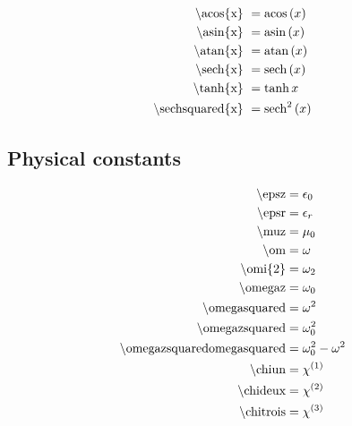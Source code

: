\begin{subequations}
\begin{align}
\textrm{\textbackslash acos\{x\}         }  & = \textrm{acos} \left( x \right)            \label{eqn:acos} \\
\textrm{\textbackslash asin\{x\}         }  & = \textrm{asin} \left( x \right)            \label{eqn:asin} \\
\textrm{\textbackslash atan\{x\}         }  & = \textrm{atan} \left( x \right)            \label{eqn:atan} \\
\textrm{\textbackslash sech\{x\}         }  & = \textrm{sech} \left( x \right)            \label{eqn:sech} \\
\textrm{\textbackslash tanh\{x\}         }  & = \tanh{x}            \label{eqn:tanh} \\
\textrm{\textbackslash sechsquared\{x\}  }  & = \textrm{sech}^2 \left( x \right)     \label{eqn:sechsquared}
\end{align}
\end{subequations}


\subsection{Physical constants}
\begin{subequations}
\begin{align}
\textrm{\textbackslash epsz}                & = \epsilon_0               \label{eqn:epsz} \\
\textrm{\textbackslash epsr}                & = \epsilon_r               \label{eqn:epsr} \\
\textrm{\textbackslash muz}                 & = \mu_0                \label{eqn:muz} \\
\textrm{\textbackslash om}                  & = \omega                 \label{eqn:om} \\
\textrm{\textbackslash omi\{2\}}            & = \omega_{2}             \label{eqn:omi} \\
\textrm{\textbackslash omegaz}              & = \omega_0             \label{eqn:omegaz} \\
\textrm{\textbackslash omegasquared}        & = \omega^2       \label{eqn:omegasquared} \\
\textrm{\textbackslash omegazsquared}       & = \omega_0^2      \label{eqn:omegazsquared} \\
\textrm{\textbackslash omegazsquaredomegasquared}   & = \omega_0^2 - \omega^2 \label{eqn:omegazsquaredomegasquared} \\
\textrm{\textbackslash chiun}               & = \chi^{(1)}              \label{eqn:chiun} \\
\textrm{\textbackslash chideux}             & = \chi^{(2)}            \label{eqn:chideux} \\
\textrm{\textbackslash chitrois}            & = \chi^{(3)}           \label{eqn:chitrois}
\end{align}
\end{subequations}


